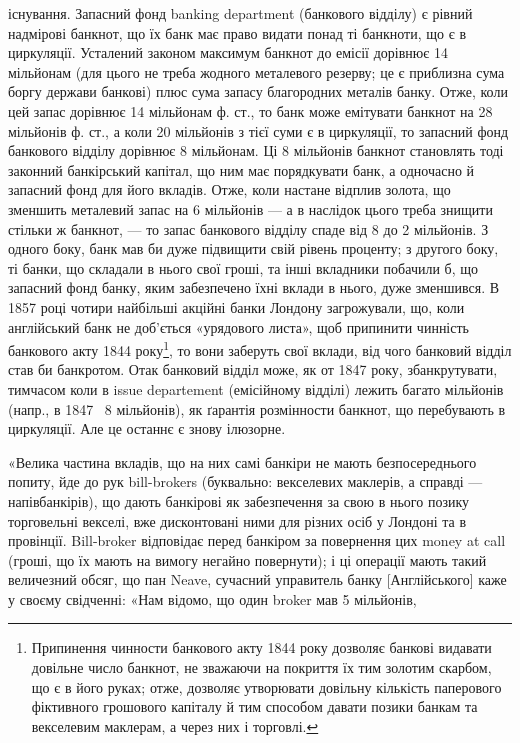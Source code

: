 існування. Запасний фонд banking department (банкового відділу) є рівний
надмірові банкнот, що їх банк має право видати понад ті банкноти, що є в
циркуляції. Усталений законом максимум банкнот до емісії дорівнює 14 мільйонам
(для цього не треба жодного металевого резерву; це є приблизна сума боргу
держави банкові) плюс сума запасу благородних металів банку. Отже, коли цей запас
дорівнює 14 мільйонам ф. ст., то банк може емітувати банкнот на 28 мільйонів ф. ст.,
а коли 20 мільйонів з тієї суми є в циркуляції, то запасний фонд банкового відділу
дорівнює 8 мільйонам. Ці 8 мільйонів банкнот становлять тоді законний банкірський
капітал, що ним має порядкувати банк, а одночасно й запасний фонд для його
вкладів. Отже, коли настане відплив золота, що зменшить металевий запас на
6 мільйонів — а в наслідок цього треба знищити стільки ж банкнот, — то запас
банкового відділу спаде від 8 до 2 мільйонів. З одного боку, банк мав би дуже
підвищити свій рівень проценту; з другого боку, ті банки, що складали в нього
свої гроші, та інші вкладники побачили б, що запасний фонд банку, яким забезпечено
їхні вклади в нього, дуже зменшився. В 1857 році чотири найбільші
акційні банки Лондону загрожували, що, коли англійський банк не доб’ється «урядового листа», щоб
припинити чинність банкового акту 1844 року\footnote{Припинення чинности банкового акту 1844 року дозволяє банкові видавати довільне число банкнот, не
зважаючи на покриття їх тим золотим скарбом, що є в його руках; отже, дозволяє утворювати довільну
кількість паперового фіктивного грошового капіталу й тим способом давати позики банкам та векселевим
маклерам, а через них і торговлі.}, то вони
заберуть свої вклади, від чого банковий відділ став би банкротом. Отак банковий
відділ може, як от 1847 року, збанкрутувати, тимчасом коли в issue departement
(емісійному відділі) лежить багато мільйонів (напр., в 1847~ 8 мільйонів),
як ґарантія розмінности банкнот, що перебувають в циркуляції. Але це
останнє є знову ілюзорне.

«Велика частина вкладів, що на них самі банкіри не мають безпосереднього
попиту, йде до рук bill-brokers (буквально: векселевих маклерів, а справді —
напівбанкірів), що дають банкірові як забезпечення за свою в нього позику
торговельні векселі, вже дисконтовані ними для різних осіб у Лондоні та в
провінції. Bill-broker відповідає перед банкіром за повернення цих money at
call (гроші, що їх мають на вимогу негайно повернути); і ці операції мають
такий величезний обсяг, що пан Neave, сучасний управитель банку [Англійського]
каже у своєму свідченні: «Нам відомо, що один broker мав 5 мільйонів,
\parbreak{}  %
